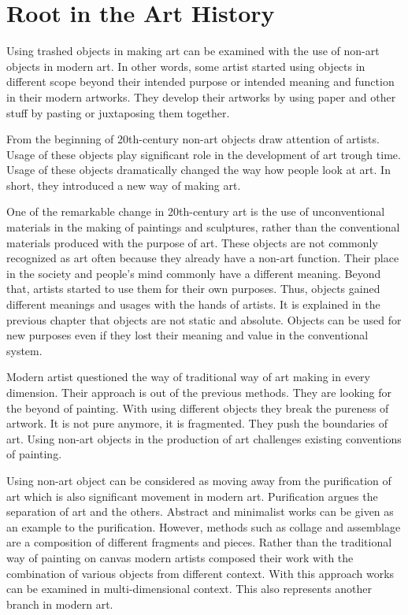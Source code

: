 \section{Root in the Art History}
Using trashed objects in making art can be examined with the use of non-art objects in modern art. In other words, some artist started using objects in different scope beyond their intended purpose or intended meaning and function in their modern artworks. They develop their artworks by using paper and other stuff by pasting or juxtaposing them together.

From the beginning of 20th-century non-art objects draw attention of artists. Usage of these objects play significant role in the development of art trough time. Usage of these objects dramatically changed the way how people look at art. In short, they introduced a new way of making art.

One of the remarkable change in 20th-century art is the use of unconventional materials in the making of paintings and sculptures, rather than the conventional materials produced with the purpose of art. These objects are not commonly recognized as art often because they already have a non-art function. Their place in the society and people's mind commonly have a different meaning. Beyond that, artists started to use them for their own purposes. Thus, objects gained different meanings and usages with the hands of artists. It is explained in the previous chapter that objects are not static and absolute. Objects can be used for new purposes even if they lost their meaning and value in the conventional system.

Modern artist questioned the way of traditional way of art making in every dimension. Their approach is out of the previous methods. They are looking for the beyond of painting. With using different objects they break the pureness of artwork. It is not pure anymore, it is fragmented. They push the boundaries of art. Using non-art objects in the production of art challenges existing conventions of painting.

Using non-art object can be considered as moving away from the purification of art which is also significant movement in modern art. Purification argues the separation of art and the others. Abstract and minimalist works can be given as an example to the purification. However, methods such as collage and assemblage are a composition of different fragments and pieces. Rather than the traditional way of painting on canvas modern artists composed their work with the combination of various objects from different context. With this approach works can be examined in multi-dimensional context. This also represents another branch in modern art.

